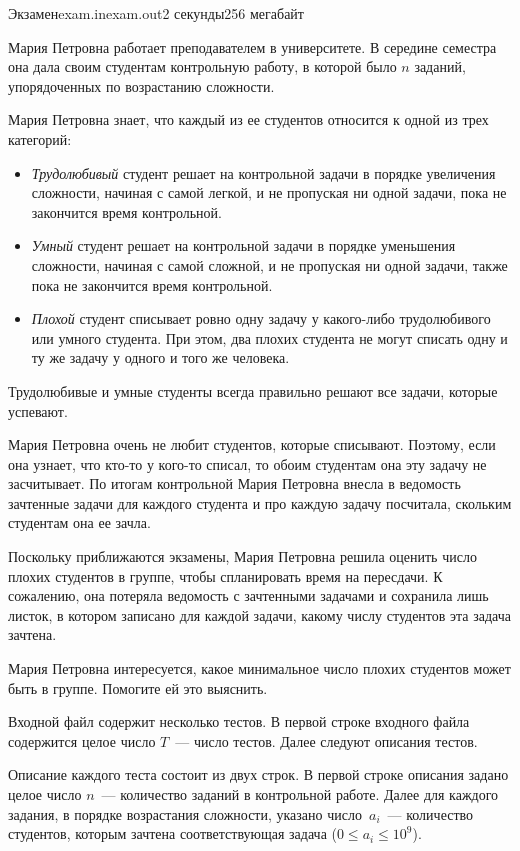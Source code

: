 \begin{problem}{Экзамен}{exam.in}{exam.out}{2 секунды}{256 мегабайт}


Мария Петровна работает преподавателем в университете. 
В середине семестра она дала своим студентам контрольную работу, в которой было $n$
заданий, упорядоченных по возрастанию сложности. 

Мария Петровна знает, что каждый из ее студентов относится к одной из трех категорий:
\begin{itemize}
\item \textit{Трудолюбивый} студент решает на контрольной задачи в порядке увеличения сложности, начиная с самой легкой, 
и не пропуская ни одной задачи, пока не закончится время контрольной.
\item \textit{Умный} студент решает на контрольной задачи в порядке уменьшения сложности, начиная с самой сложной,
и не пропуская ни одной задачи, также пока не закончится время контрольной.
\item \textit{Плохой} студент списывает ровно одну задачу у какого-либо трудолюбивого или умного студента. 
При этом, два плохих студента не могут списать одну и 
ту же задачу у одного и того же человека.
\end{itemize}
Трудолюбивые и умные студенты всегда правильно решают все задачи, которые успевают.

Мария Петровна очень не любит студентов, которые списывают. Поэтому, если она узнает, что кто-то у кого-то списал,
то обоим студентам она эту задачу не засчитывает. 
По итогам контрольной Мария Петровна внесла в ведомость зачтенные задачи для каждого студента и
про каждую задачу посчитала, скольким студентам она ее зачла. 

Поскольку приближаются экзамены, Мария Петровна решила оценить число
плохих студентов в группе, чтобы спланировать время на пересдачи.
К сожалению, она потеряла ведомость с зачтенными задачами и сохранила 
лишь листок, в котором записано для каждой задачи, какому числу студентов
эта задача зачтена. 

Мария Петровна интересуется, какое минимальное
число плохих студентов может быть в группе.
Помогите ей это выяснить.

\InputFile
Входной файл содержит несколько тестов.
В первой строке входного файла содержится целое число $T$~--- число тестов.
Далее следуют описания тестов.

Описание каждого теста состоит из двух строк.
В первой строке описания задано целое число $n$~--- количество заданий в контрольной работе.
Далее для каждого задания, в порядке возрастания сложности, указано число~$a_i$~--- количество студентов, 
которым зачтена соответствующая задача ($0 \le a_i \le 10^9$). 


\end{problem}
